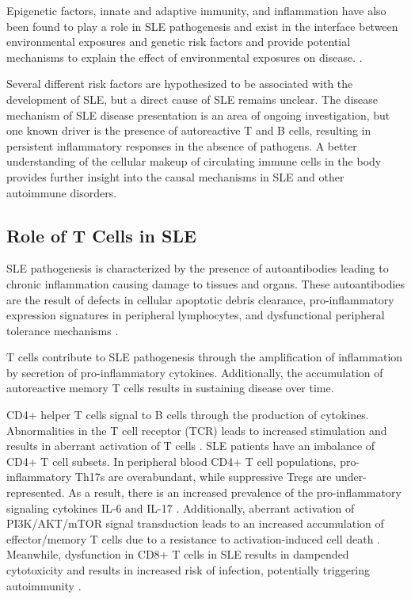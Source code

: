 Epigenetic factors, innate and adaptive immunity, and inflammation have also been found to play a role in SLE pathogenesis and exist in the interface between environmental exposures and genetic risk factors and provide potential mechanisms to explain the effect of environmental exposures on disease. \cite{TERUEL2016161, Woo_2022}.


Several different risk factors are hypothesized to be associated with the development of SLE, but a direct cause of SLE remains unclear. The disease mechanism of SLE disease presentation is an area of ongoing investigation, but one known driver is the presence of autoreactive T and B cells, resulting in persistent inflammatory responses in the absence of pathogens. A better understanding of the cellular makeup of circulating immune cells in the body provides further insight into the causal mechanisms in SLE and other autoimmune disorders.

\subsection{Role of T Cells in SLE}

SLE pathogenesis is characterized by the presence of autoantibodies leading to chronic inflammation causing damage to tissues and organs. These autoantibodies are the result of defects in cellular apoptotic debris clearance, pro-inflammatory expression signatures in peripheral lymphocytes, and dysfunctional peripheral tolerance mechanisms \cite{slepath}. 

T cells contribute to SLE pathogenesis through the amplification of inflammation by secretion of pro-inflammatory cytokines. Additionally, the accumulation of autoreactive memory T cells results in sustaining disease over time.

CD4+ helper T cells signal to B cells through the production of cytokines. Abnormalities in the T cell receptor (TCR) leads to increased stimulation and results in aberrant activation of T cells \cite{Moulton_2015}. SLE patients have an imbalance of CD4+ T cell subsets. In peripheral blood CD4+ T cell populations, pro-inflammatory Th17s are overabundant, while suppressive Tregs are under-represented. As a result, there is an increased prevalence of the pro-inflammatory signaling cytokines IL-6 and IL-17 \cite{Talaat_2015}. Additionally, aberrant activation of PI3K/AKT/mTOR signal transduction leads to an increased accumulation of effector/memory T cells due to a resistance to activation-induced cell death \cite{Su_rez_Fueyo_2011}. Meanwhile, dysfunction in CD8+ T cells in SLE results in dampended cytotoxicity and results in increased risk of infection, potentially triggering autoimmunity \cite{Gravano_2013}. 

